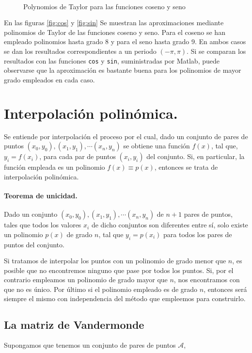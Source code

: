 \begin{figure}
\centering
{} \qquad 
{}\\
\caption{Polynomios de Taylor para las funciones coseno y seno  }
\end{figure}
\begin{paracol}{2}
En las figuras \ref{fig:cos} y \ref{fig:sin} Se muestran las aproximaciones mediante polinomios de Taylor de las funciones coseno y seno. Para el coseno se han empleado polinomios hasta grado 8 y para el seno hasta grado 9. En ambos casos se dan los resultados correspondientes a un periodo $(-\pi, \pi)$. Si se comparan los resultados con las funciones \texttt{cos} y \texttt{sin}, suministradas por Matlab, puede observarse que la aproximación es bastante buena para los polinomios de mayor grado empleados en cada caso.

\section{Interpolación polinómica.}

Se entiende por interpolación el proceso por el cual, dado un conjunto de pares de puntos $(x_0,y_0),(x_1,y_1),\cdots (x_n,y_n)$ se obtiene una función $f(x)$, tal que, $y_i=f(x_i)$, para cada par de puntos $(x_i,y_i)$ del conjunto. Si, en particular, la función empleada es un polinomio $f(x)\equiv p(x)$, entonces se trata de interpolación polinómica. 

\paragraph{Teorema de unicidad.} Dado un conjunto   $(x_0,y_0),(x_1,y_1),\cdots (x_n,y_n)$ de $n+1$ pares de puntos, tales que todos los valores $x_i$ de dicho conjuntos son diferentes entre sí, solo existe un polinomio $p(x)$ de grado $n$, tal que $y_i=p(x_i)$ para todos los pares de puntos del conjunto.

Si tratamos de interpolar los puntos con un polinomio de grado menor que $n$, es posible que no encontremos ninguno que pase por todos los puntos. Si, por el contrario empleamos un polinomio de grado mayor que $n$, nos encontramos con que no es único. Por último si el polinomio empleado es de grado $n$, entonces será siempre el mismo con independencia del método que empleemos para construirlo.

\subsection{La matriz de Vandermonde} 
Supongamos que tenemos un conjunto de pares de puntos $\mathcal{A}$, 
\end{paracol}

